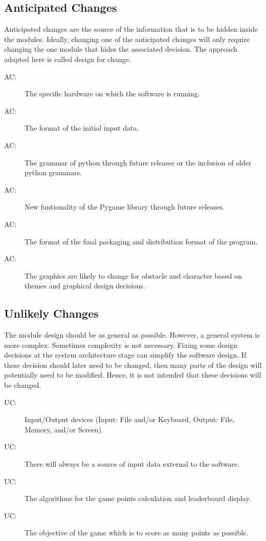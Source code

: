 \documentclass[12pt, titlepage]{article}
\newcounter{acnum}
\newcommand{\actheacnum}{AC\theacnum}
\newcounter{ucnum}
\newcommand{\uctheucnum}{UC\theucnum}
\begin{document}
\subsection{Anticipated Changes} \label{SecAchange}

Anticipated changes are the source of the information that is to be hidden
inside the modules. Ideally, changing one of the anticipated changes will only
require changing the one module that hides the associated decision. The approach
adapted here is called design for
change.

\begin{description}
\item[ \actheacnum \label{acHardware}:] The specific
  hardware on which the software is running.
\item[ \actheacnum \label{acInput}:] The format of the
  initial input data.
\item[ \actheacnum \label{acInput}:] The grammar of python through future releases or the inclusion of older python grammars.
\item[ \actheacnum \label{acInput}:] New funtionality of the Pygame library through future releases.
\item[ \actheacnum \label{acInput}:] The format of the final packaging and distribution format of the program.
\item[ \actheacnum \label{acInput}:] The graphics are likely to change for obstacle and character based on themes and graphical design decisions. 
\end{description}

\subsection{Unlikely Changes} \label{SecUchange}

The module design should be as general as possible. However, a general system is
more complex. Sometimes complexity is not necessary. Fixing some design
decisions at the system architecture stage can simplify the software design. If
these decision should later need to be changed, then many parts of the design
will potentially need to be modified. Hence, it is not intended that these
decisions will be changed.

\begin{description}
\item[ \uctheucnum \label{ucIO}:] Input/Output devices
  (Input: File and/or Keyboard, Output: File, Memory, and/or Screen).
\item[ \uctheucnum \label{ucInput}:] There will always be
  a source of input data external to the software.
\item[ \uctheucnum \label{ucInput}:] The algorithms for the game points calculation and leaderboard display.
\item[ \uctheucnum \label{ucInput}:] The objective of the game which is to score as many points as possible. 
\end{description}
\end{document}

